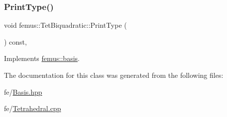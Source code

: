 \mbox{\label{classfemus_1_1_tet_biquadratic_a2ada2728eefe378323b74924a2c4b4c8}} 
\subsubsection{\texorpdfstring{Print\+Type()}{PrintType()}}
{\footnotesize\ttfamily void femus\+::\+Tet\+Biquadratic\+::\+Print\+Type (\begin{DoxyParamCaption}{ }\end{DoxyParamCaption}) const\hspace{0.3cm}{\ttfamily [inline]}, {\ttfamily [virtual]}}



Implements \mbox{\hyperlink{classfemus_1_1basis_abbae7bf8f31ec5793c911bc6d4ea0572}{femus\+::basis}}.



The documentation for this class was generated from the following files\+:\begin{DoxyCompactItemize}
\item 
fe/\mbox{\hyperlink{_basis_8hpp}{Basis.\+hpp}}\item 
fe/\mbox{\hyperlink{_tetrahedral_8cpp}{Tetrahedral.\+cpp}}\end{DoxyCompactItemize}
